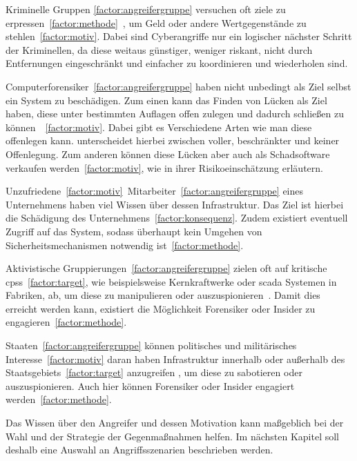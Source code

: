 \documentclass[final,bibliography=totocnumbered]{include/sikseminar}
\newcommand{\cps}{\glspl{cps}\xspace}
\begin{document}
    Kriminelle Gruppen \ref{factor:angreifergruppe} versuchen oft ziele zu erpressen~\ref{factor:methode}~\cite{WYX+10}, um Geld oder andere Wertgegenstände zu stehlen~\ref{factor:motiv}.
    Dabei sind Cyberangriffe nur ein logischer nächster Schritt der Kriminellen, da diese weitaus günstiger, weniger riskant, nicht durch Entfernungen eingeschränkt und einfacher zu koordinieren und wiederholen sind. \cite{CAS+09}

    Computerforensiker~\ref{factor:angreifergruppe} haben nicht unbedingt als Ziel selbst ein System zu beschädigen.
    Zum einen kann das Finden von Lücken als Ziel haben, diese unter bestimmten Auflagen offen zulegen und dadurch schließen zu können~\cite{Hahn2012}~\ref{factor:motiv}.
    Dabei gibt es Verschiedene Arten wie man diese offenlegen kann. \citeauthor{Hahn2012} unterscheidet hierbei zwischen voller, beschränkter und keiner Offenlegung.
    Zum anderen können diese Lücken aber auch als Schadsoftware verkaufen werden~\ref{factor:motiv}, wie \citeauthor{Allodi2013} in ihrer Risikoeinschätzung \cite{Allodi2013} erläutern.

    Unzufriedene~\ref{factor:motiv}~Mitarbeiter~\ref{factor:angreifergruppe} eines Unternehmens haben viel Wissen über dessen Infrastruktur.
    Das Ziel ist hierbei die Schädigung des Unternehmens~\ref{factor:konsequenz}.
    Zudem existiert eventuell Zugriff auf das System, sodass überhaupt kein Umgehen von Sicherheitsmechanismen notwendig ist~\ref{factor:methode}.~\cite{CAS+09,WYX+10}

    Aktivistische Gruppierungen~\ref{factor:angreifergruppe} zielen oft auf kritische \cps~\ref{factor:target}, wie beispielsweise Kernkraftwerke oder \gls{scada} Systemen in Fabriken, ab, um diese zu manipulieren oder auszuspionieren~\cite{CAS+09,HLL+17}.
    Damit dies erreicht werden kann, existiert die Möglichkeit Forensiker oder Insider zu engagieren~\ref{factor:methode}.~\cite{WYX+10}

    Staaten~\ref{factor:angreifergruppe} können politisches und militärisches Interesse~\ref{factor:motiv} daran haben Infrastruktur innerhalb oder außerhalb des Staatsgebiets~\ref{factor:target} anzugreifen \cite{CAS+09}, um diese zu sabotieren oder auszuspionieren.
    Auch hier können Forensiker oder Insider engagiert werden~\ref{factor:methode}.

    Das Wissen über den Angreifer und dessen Motivation kann maßgeblich bei der Wahl und der Strategie der Gegenmaßnahmen helfen.
    Im nächsten Kapitel soll deshalb eine Auswahl an Angriffsszenarien beschrieben werden.
\end{document}
